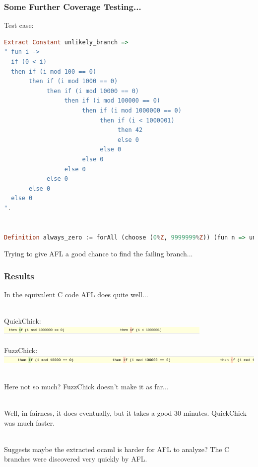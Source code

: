 \documentclass{beamer}
\begin{document}
\begin{frame}[fragile]
  \frametitle{Some Further Coverage Testing...}

  Test case:

\begin{lstlisting}[language=Haskell]
Extract Constant unlikely_branch =>
" fun i ->
  if (0 < i)
  then if (i mod 100 == 0)
       then if (i mod 1000 == 0)
            then if (i mod 10000 == 0)
                 then if (i mod 100000 == 0)
                      then if (i mod 1000000 == 0)
                           then if (i < 1000001)
                                then 42
                                else 0
                           else 0
                      else 0
                 else 0
            else 0
       else 0
  else 0
".


Definition always_zero := forAll (choose (0%Z, 9999999%Z)) (fun n => unlikely_branch n =? 0).
\end{lstlisting}

  \pause

  {\large Trying to give AFL a good chance to find the failing branch...}

\end{frame}

\begin{frame}
  \frametitle{Results}

  In the equivalent C code AFL does quite well... \\~\\

  \pause

  QuickChick: \\

  \includegraphics[width=\textwidth]{qc_branches.png} \\~\\

  FuzzChick: \\

  \includegraphics[width=\textwidth]{fuzz_branches.png} \\~\\

  \pause
  
  Here not so much? FuzzChick doesn't make it as far... \\~\\

  \pause

  Well, in fairness, it does eventually, but it takes a good 30
  minutes. QuickChick was much faster. \\~\\

  \pause

  Suggests maybe the extracted ocaml is harder for AFL to analyze? The
  C branches were discovered very quickly by AFL.
  
\end{frame}
\end{document}
